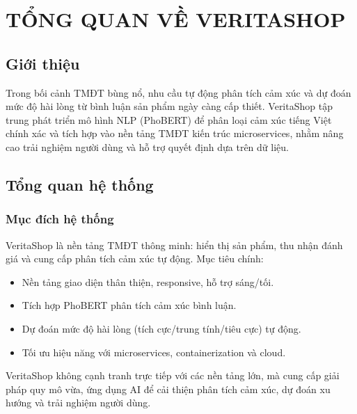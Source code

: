 
\newpage

\section{\textbf{TỔNG QUAN VỀ VERITASHOP}}

\subsection{Giới thiệu}
Trong bối cảnh TMĐT bùng nổ, nhu cầu tự động phân tích cảm xúc và dự đoán mức độ hài lòng từ bình luận sản phẩm ngày càng cấp thiết. VeritaShop tập trung phát triển mô hình NLP (PhoBERT) để phân loại cảm xúc tiếng Việt chính xác và tích hợp vào nền tảng TMĐT kiến trúc microservices, nhằm nâng cao trải nghiệm người dùng và hỗ trợ quyết định dựa trên dữ liệu.

\subsection{Tổng quan hệ thống}
\subsubsection{Mục đích hệ thống}
VeritaShop là nền tảng TMĐT thông minh: hiển thị sản phẩm, thu nhận đánh giá và cung cấp phân tích cảm xúc tự động. Mục tiêu chính:
\begin{itemize}
    \item Nền tảng giao diện thân thiện, responsive, hỗ trợ sáng/tối.
    \item Tích hợp PhoBERT phân tích cảm xúc bình luận.
    \item Dự đoán mức độ hài lòng (tích cực/trung tính/tiêu cực) tự động.
    \item Tối ưu hiệu năng với microservices, containerization và cloud.
\end{itemize}
VeritaShop không cạnh tranh trực tiếp với các nền tảng lớn, mà cung cấp giải pháp quy mô vừa, ứng dụng AI để cải thiện phân tích cảm xúc, dự đoán xu hướng và trải nghiệm người dùng.

